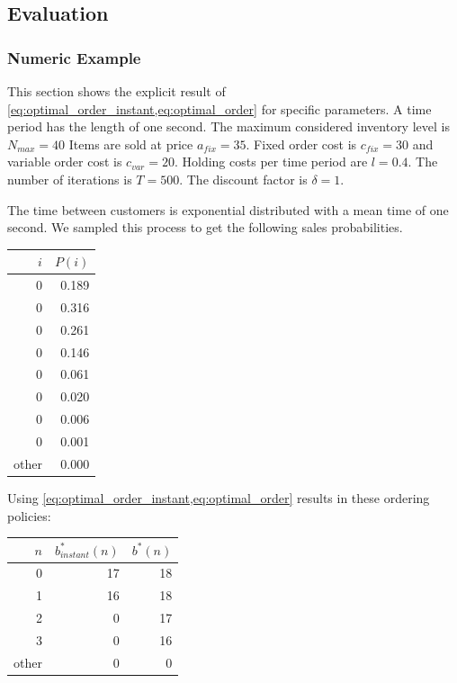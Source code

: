 \subsection{Evaluation}

\subsubsection{Numeric Example}
\label{section:order_example}
This section shows the explicit result of \cref{eq:optimal_order_instant,eq:optimal_order} for specific parameters. A time period has the length of one second.
The maximum considered inventory level is $N_{max} = 40$
Items are sold at price $a_{fix} = 35$.
Fixed order cost is $c_{fix} = 30$ and variable order cost is $c_{var} = 20$.
Holding costs per time period are $l = 0.4$.
The number of iterations is $T = 500$.
The discount factor is $\delta = 1$.

The time between customers is exponential distributed with a mean time of one second.
We sampled this process to get the following sales probabilities.

\begin{table}
\centering
\begin{tabular}{rr}
	\toprule
	$i$ & $P(i)$ \\
	\midrule
	0 & 0.189 \\
	0 & 0.316 \\
	0 & 0.261 \\
	0 & 0.146 \\
	0 & 0.061 \\
	0 & 0.020 \\
	0 & 0.006 \\
	0 & 0.001 \\
	other & 0.000 \\
	\bottomrule
\end{tabular}
\end{table}

Using \cref{eq:optimal_order_instant,eq:optimal_order} results in these ordering policies:

\begin{table}
	\centering
	\begin{tabular}{rrr}
		\toprule
		$n$ & $b^*_{instant}(n)$ & $b^*(n)$ \\
		\midrule
		0 & 17 & 18 \\
		1 & 16 & 18 \\
		2 & 0 & 17 \\
		3 & 0 & 16\\
		other & 0 & 0 \\
		\bottomrule
	\end{tabular}
\end{table}

